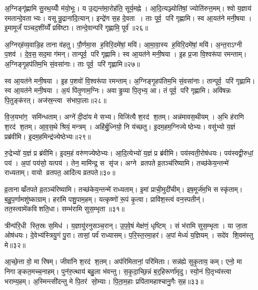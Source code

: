 अ॒ग्निङ्गृ॑ह्णामि सु॒रथ॒य्योँ म॑यो॒भूः। य उ॒द्यन्त॑मा॒रोह॑ति॒ सूर्य॒मह्ने। आ॒दि॒त्यञ्ज्योति॑षां॒ ज्योति॑रुत्त॒मम्। श्वो य॒ज्ञाय॑ रमतान्दे॒वताभ्यः। वसून्रु॒द्राना॑दि॒त्यान्। इन्द्रे॑ण स॒ह दे॒वता। ताः पूर्व॒ परि॑ गृह्णामि। स्व आ॒यत॑ने मनी॒षया। इ॒मामूर्जं॑ पञ्चद॒शींय्येँ प्रवि॑ष्टाः। तान्दे॒वान्परि॑ गृह्णामि॒ पूर्व॑॥२६॥

अ॒ग्निर्‌ह॑व्य॒वाडि॒ह ताना व॑हतु। पौ॒र्णमा॒स ह॒विरि॒दमे॑षां॒ मयि॑। आ॒मा॒वा॒स्य ह॒विरि॒दमे॑षां॒ मयि॑। अ॒न्त॒राऽग्नी प॒शव॑। दे॒व॒स॒सद॒मा ग॑मन्। तान्पूर्व॒ परि॑ गृह्णामि। स्व आ॒यत॑ने मनी॒षया। इ॒ह प्र॒जा वि॒श्वरू॑पा रमन्ताम्। अ॒ग्निङ्गृ॒हप॑तिम॒भि सं॒वसा॑नाः। ताः पूर्व॒ परि॑ गृह्णामि॥२७॥

स्व आ॒यत॑ने मनी॒षया। इ॒ह प॒शवो॑ वि॒श्वरू॑पा रमन्ताम्। अ॒ग्निङ्गृ॒हप॑तिम॒भि सं॒वसा॑नाः। तान्पूर्व॒ परि॑ गृह्णामि। स्व आ॒यत॑ने मनी॒षया। अ॒यं पि॑तृ॒णाम॒ग्निः। अवाड्ढ॒व्या पि॒तृभ्य॒ आ। तं पूर्व॒ परि॑ गृह्णामि। अवि॑षन्नः पि॒तुङ्क॑रत्। अज॑स्र॒न्त्वा स॑भापा॒लाः॥२८॥

वि॒ज॒यभा॑ग॒ समि॑न्धताम्। अग्ने॑ दी॒दा॑य मे सभ्य। विजि॑त्यै श॒रद॑ श॒तम्। अन्न॑मावस॒थीयम्। अ॒भि ह॑राणि श॒रद॑ श॒तम्। आ॒व॒स॒थे श्रियं॒ मन्त्रम्। अहि॑र्बु॒ध्नियो॒ नि य॑च्छतु। इ॒दम॒हम॒ग्निज्येष्ठेभ्यः। वसु॑भ्यो य॒ज्ञं प्रब्र॑वीमि। इ॒दम॒हमिन्द्र॑ज्येष्ठेभ्यः॥२९॥

रु॒द्रेभ्यो॑ य॒ज्ञं प्र ब्र॑वीमि। इ॒दम॒हं वरु॑णज्येष्ठेभ्यः। आ॒दि॒त्येभ्यो॑ य॒ज्ञं प्र ब्र॑वीमि। पय॑स्वती॒रोष॑धयः। पय॑स्वद्वी॒रुधां॒ पय॑। अ॒पां पय॑सो॒ यत्पय॑। तेन॒ मामि॑न्द्र॒ स सृ॑ज। अग्ने व्रतपते व्र॒तञ्च॑रिष्यामि। तच्छ॑केय॒न्तन्मे॑ राध्यताम्। वायो व्रतपत॒ आदि॑त्य व्रतपते॥३०॥

व्र॒तानाव्व्रँतपते व्र॒तञ्च॑रिष्यामि। तच्छ॑केय॒न्तन्मे॑ राध्यताम्। इ॒मां प्राची॒मुदी॑चीम्। इष॒मूर्ज॑म॒भि सस्कृ॑ताम्। ब॒हु॒प॒र्णामशु॑ष्काग्राम्। हरा॑मि पशु॒पाम॒हम्। यत्कृष्णो॑ रू॒पं कृ॒त्वा। प्रावि॑श॒स्त्वं वन॒स्पतीन्॑। तत॒स्त्वामे॑कविशति॒धा। सम्भ॑रामि सुस॒म्भृता॥३१॥

त्रीन्प॑रि॒धी स्ति॒स्रः स॒मिध॑। य॒ज्ञायु॑रनुसञ्च॒रान्। उ॒प॒वे॒षं मेक्ष॑णं॒ धृष्टिम्। सं भ॑रामि सुस॒म्भृता। या जा॒ता ओष॑धयः। दे॒वेभ्य॑स्त्रियु॒गं पु॒रा। तासां॒ पर्व॑ राध्यासम्। प॒रि॒स्त॒रमा॒हर\sn{}॑। अ॒पां मेध्यं॑ य॒ज्ञियम्। सदे॑व शि॒वम॑स्तु मे॥३२॥

आ॒च्छे॒त्ता वो॒ मा रि॑षम्। जीवा॑नि श॒रद॑ श॒तम्। अप॑रिमितानां॒ परि॑मिताः। सन्न॑ह्ये सुकृ॒ताय॒ कम्। एनो॒ मा निगाङ्कत॒मच्च॒नाहम्। पुन॑रु॒त्थाय॑ बहु॒ला भ॑वन्तु। स॒कृ॒दा॒च्छि॒न्नं ब॒र्॒हिरूर्णा॑मृदु। स्यो॒नं पि॒तृभ्य॑स्त्वा भराम्य॒हम्। अ॒स्मिन्त्सी॑दन्तु मे पि॒तर॑ सो॒म्याः। पि॒ता॒म॒हाः प्रपि॑तामहाश्चानु॒गैः स॒ह॥३३॥

